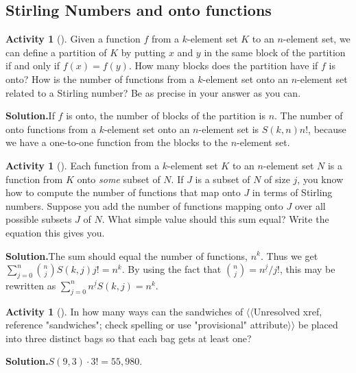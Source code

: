 \documentclass[10pt,]{book}
\theoremstyle{plain}
\theoremstyle{definition}
\newtheorem{activity}[project]{Activity}
\numberwithin{equation}{chapter}
\begin{document}
\subsection[{Stirling Numbers and onto functions}]{Stirling Numbers and onto functions}\label{subsection-28}
\begin{activity}[]\label{activity-72}
Given a function \(f\) from a \(k\)-element set \(K\) to an \(n\)-element set, we can define a partition of \(K\) by putting \(x\) and \(y\) in the same block of the partition if and only if \(f(x)=f(y)\). How many blocks does the partition have if \(f\) is onto? How is the number of functions from a \(k\)-element set onto an \(n\)-element set related to a Stirling number? Be as precise in your answer as you can.%
\par\medskip\noindent%
\textbf{Solution.}\quad If \(f\) is onto, the number of blocks of the partition is \(n\). The number of onto functions from a \(k\)-element set onto an \(n\)-element set is \(S(k,n)n!\), because we have a one-to-one function from the blocks to the \(n\)-element set.%
\end{activity}
\begin{activity}[]\label{Stirlingfalling}
Each function from a \(k\)-element set \(K\) to an \(n\)-element set \(N\) is a function from \(K\) onto \emph{some} subset of \(N\). If \(J\) is a subset of \(N\) of size \(j\), you know how to compute the number of functions that map onto \(J\) in terms of Stirling numbers. Suppose you add the number of functions mapping onto \(J\) over all possible subsets \(J\) of \(N\). What simple value should this sum equal? Write the equation this gives you.%
\par\medskip\noindent%
\textbf{Solution.}\quad The sum should equal the number of functions, \(n^k\). Thus we get \(\sum_{j=0}^n {n\choose j}S(k,j)j! = n^k\). By using the fact that \({n\choose j}= n^{\underline{j}}/j!\), this may be rewritten as \(\sum_{j=0}^n n^{\underline{j}}S(k,j) = n^k.\)%
\end{activity}
\begin{activity}[]\label{activity-74}
In how many ways can the sandwiches of {$\langle\langle$Unresolved xref, reference "sandwiches"; check spelling or use "provisional" attribute$\rangle\rangle$} be placed into three distinct bags so that each bag gets at least one?%
\par\medskip\noindent%
\textbf{Solution.}\quad \(S(9,3)\cdot3!= 55,980\).%
\end{activity}
\end{document}
